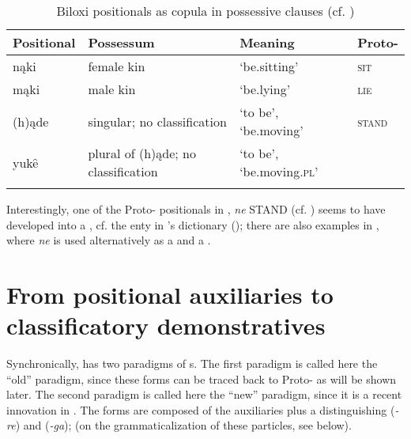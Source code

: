 \documentclass[output=paper]{langsci/langscibook}
\begin{document}
\begin{table}
\begin{tabularx}{\textwidth}{llQl}
\lsptoprule
Positional & Possessum & Meaning & Proto-\\
\midrule 
{nąki} & female kin & `be.sitting' & \scshape sit\\
{mąki} & male kin & `be.lying' & \scshape lie\\
({h}){ąde} & singular; no classification & `to be', `be.moving' & \scshape stand\\
{yuk}{ȇ} & plural of ({h}){ąde}; no classification & `to be', `be.moving.\textsc{pl}' & \\
\lspbottomrule
\end{tabularx}
\caption{Biloxi positionals as copula in possessive clauses (cf. \citealt{Kaufmann2011})}
\label{tab:helmbrecht:10}
\end{table}

Interestingly, one of the Proto- positionals in , \textit{ne} STAND (cf. ) seems to have developed into a , cf. the enty in \citeauthor{Kaufmann2011}'s  dictionary (\citeyear[100]{Kaufmann2011}); there are also examples in \citet[117--167]{Dorsey1912}, where \textit{ne} is used alternatively as a  and a . 

\section{From positional auxiliaries to classificatory demonstratives}\label{sec:helmbrecht:3}

Synchronically,  has two paradigms of s. The first paradigm is called here the ``old'' paradigm, since these forms can be traced back to Proto- as will be shown later. The second paradigm is called here the ``new'' paradigm, since it is a recent innovation in . The forms are composed of the  auxiliaries plus a  distinguishing  (\textit{-re}) and  (\textit{-ga}); (on the grammaticalization of these particles, see  below).
\end{document}
